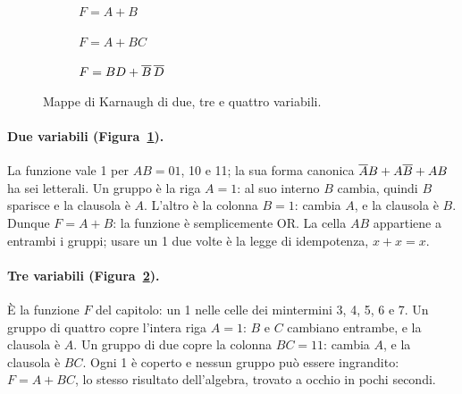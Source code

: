 \begin{figure}[htb]
\centering
\begin{subfigure}[b]{0.25\textwidth}\centering
{}
\caption{$F=A+B$}\label{fig:b2:k2}
\end{subfigure}\hfill
\begin{subfigure}[b]{0.36\textwidth}\centering
{}
\caption{$F=A+BC$}\label{fig:b2:k3}
\end{subfigure}\hfill
\begin{subfigure}[b]{0.36\textwidth}\centering
{}
\caption{$F=BD+\overline{B}\,\overline{D}$}\label{fig:b2:k4}
\end{subfigure}
\caption{Mappe di Karnaugh di due, tre e quattro variabili.}
\label{fig:b2:kmaps}
\end{figure}

\paragraph{Due variabili (Figura~\ref{fig:b2:k2}).} La funzione vale 1 per
$AB=01$, 10 e 11; la sua forma canonica $\overline{A}B+A\overline{B}+AB$ ha sei
letterali. Un gruppo è la riga $A=1$: al suo interno $B$ cambia, quindi $B$
sparisce e la clausola è $A$. L'altro è la colonna $B=1$: cambia $A$, e la
clausola è $B$. Dunque $F=A+B$: la funzione è semplicemente OR. La cella $AB$
appartiene a entrambi i gruppi; usare un 1 due volte è la legge di
idempotenza, $x+x=x$.

\paragraph{Tre variabili (Figura~\ref{fig:b2:k3}).} È la funzione $F$ del
capitolo: un 1 nelle celle dei mintermini 3, 4, 5, 6 e 7. Un gruppo di quattro
copre l'intera riga $A=1$: $B$ e $C$ cambiano entrambe, e la clausola è $A$.
Un gruppo di due copre la colonna $BC=11$: cambia $A$, e la clausola è $BC$.
Ogni 1 è coperto e nessun gruppo può essere ingrandito: $F=A+BC$, lo stesso
risultato dell'algebra, trovato a occhio in pochi secondi.

